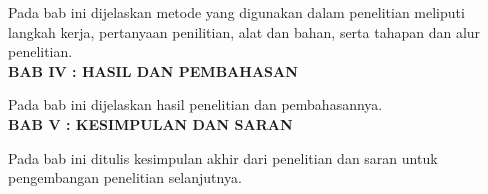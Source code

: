 Pada bab ini dijelaskan metode yang digunakan dalam penelitian meliputi langkah kerja, pertanyaan penilitian, alat dan bahan, serta tahapan dan alur penelitian.\\

\noindent
\textbf{BAB IV : HASIL DAN PEMBAHASAN}

Pada bab ini dijelaskan hasil penelitian dan pembahasannya.\\

\noindent
\textbf{BAB V : KESIMPULAN DAN SARAN}

Pada bab ini ditulis kesimpulan akhir dari penelitian dan saran untuk pengembangan penelitian selanjutnya.\\

